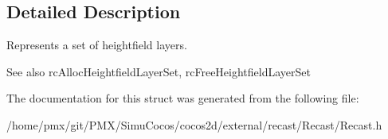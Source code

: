 \subsection{Detailed Description}
Represents a set of heightfield layers.

\begin{DoxySeeAlso}{See also}
rc\+Alloc\+Heightfield\+Layer\+Set, rc\+Free\+Heightfield\+Layer\+Set 
\end{DoxySeeAlso}


The documentation for this struct was generated from the following file\+:\begin{DoxyCompactItemize}
\item 
/home/pmx/git/\+P\+M\+X/\+Simu\+Cocos/cocos2d/external/recast/\+Recast/Recast.\+h\end{DoxyCompactItemize}
